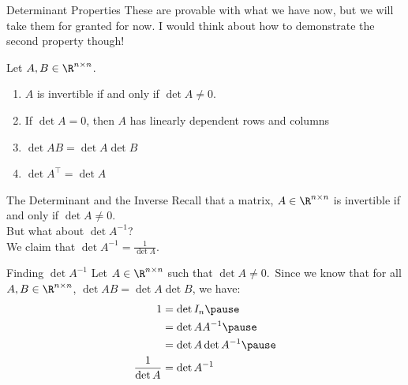\documentclass[xcoler=dvipsnames, aspectratio=169]{beamer}
\begin{document}
    \begin{frame}{Determinant Properties}
        These are provable with what we have now, but we will take them for granted for now.
        I would think about how to demonstrate the second property though!

        Let $A,B\in\R^{n\times n}$.
        \begin{enumerate}
            \pause\item $A$ is invertible if and only if $\det{A} \neq 0$.
            \pause\item If $\det{A}=0$, then $A$ has linearly dependent rows and columns
            \pause\item $\det{AB} = \det{A}\det{B}$
            \pause\item $\det{A^\top}=\det{A}$
        \end{enumerate}
    \end{frame}
    \begin{frame}{The Determinant and the Inverse}
        Recall that a matrix, $A\in\R^{n\times n}$ is invertible if and only
        if $\det{A} \neq 0$.\pause\\

        But what about $\det{A^{-1}}$?\pause\\

        We claim that $\det{A^{-1}} = \frac{1}{\det{A}}$.
    \end{frame}
    \begin{frame}{Finding $\det{A^{-1}}$}
        Let $A\in\R^{n\times n}$ such that $\det{A}\neq 0$.\pause\ Since we know that
        for all $A,B\in\R^{n\times n}$, $\det{AB}=\det{A}\det{B}$, we have:\pause
        \begin{align*}
            1   &= \det{I_n}\pause \\
                &= \det{AA^{-1}}\pause\\
                &= \det{A}\det{A^{-1}}\pause\\
            \frac{1}{\det{A}} &= \det{A^{-1}}
        \end{align*}
    \end{frame}
\end{document}
